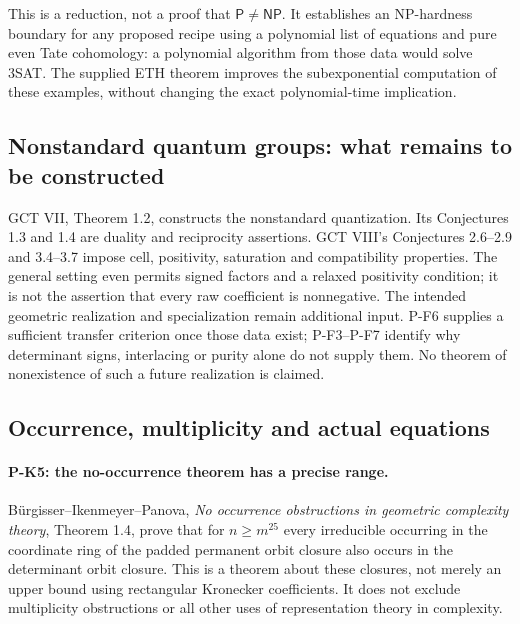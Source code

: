 This is a reduction, not a proof that $\mathsf P\ne\mathsf{NP}$.
It establishes an NP-hardness boundary for any proposed recipe using
a polynomial list of equations and pure even Tate cohomology:
a polynomial algorithm from those data would solve 3SAT.
The supplied ETH theorem improves the subexponential computation of
these examples, without changing the exact polynomial-time implication.

\subsection{Nonstandard quantum groups: what remains to be constructed}
GCT VII, Theorem 1.2, constructs the nonstandard quantization.
Its Conjectures 1.3 and 1.4 are duality and reciprocity assertions.
GCT VIII's Conjectures 2.6--2.9 and 3.4--3.7 impose cell, positivity,
saturation and compatibility properties. The general setting even
permits signed factors and a relaxed positivity condition; it is not
the assertion that every raw coefficient is nonnegative.
The intended geometric realization and specialization remain additional
input. P-F6 supplies a sufficient transfer criterion once those data
exist; P-F3--P-F7 identify why determinant signs, interlacing or purity
alone do not supply them. No theorem of nonexistence of such a future
realization is claimed.

\subsection{Occurrence, multiplicity and actual equations}

\paragraph{P-K5: the no-occurrence theorem has a precise range.}
B\"urgisser--Ikenmeyer--Panova, \emph{No occurrence obstructions in
geometric complexity theory}, Theorem 1.4, prove that for
$n\ge m^{25}$ every irreducible occurring in the coordinate ring of
the padded permanent orbit closure also occurs in the determinant
orbit closure. This is a theorem about these closures, not merely an
upper bound using rectangular Kronecker coefficients. It does not
exclude multiplicity obstructions or all other uses of representation
theory in complexity.


